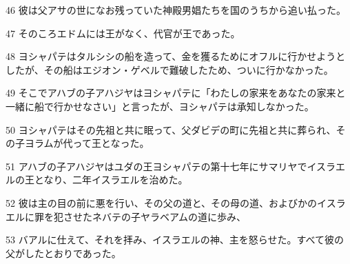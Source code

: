 \par 46 彼は父アサの世になお残っていた神殿男娼たちを国のうちから追い払った。
\par 47 そのころエドムには王がなく、代官が王であった。
\par 48 ヨシャパテはタルシシの船を造って、金を獲るためにオフルに行かせようとしたが、その船はエジオン・ゲベルで難破したため、ついに行かなかった。
\par 49 そこでアハブの子アハジヤはヨシャパテに「わたしの家来をあなたの家来と一緒に船で行かせなさい」と言ったが、ヨシャパテは承知しなかった。
\par 50 ヨシャパテはその先祖と共に眠って、父ダビデの町に先祖と共に葬られ、その子ヨラムが代って王となった。
\par 51 アハブの子アハジヤはユダの王ヨシャパテの第十七年にサマリヤでイスラエルの王となり、二年イスラエルを治めた。
\par 52 彼は主の目の前に悪を行い、その父の道と、その母の道、およびかのイスラエルに罪を犯させたネバテの子ヤラベアムの道に歩み、
\par 53 バアルに仕えて、それを拝み、イスラエルの神、主を怒らせた。すべて彼の父がしたとおりであった。


